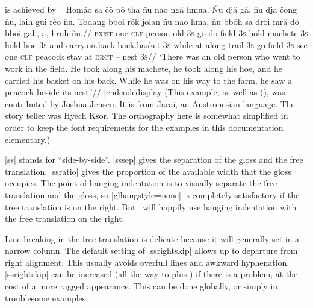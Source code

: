 \noindent is achieved by
\codedisplay~
\ex[glftpos=right,glhangstyle=none]
\let\\=\textsc
\begingl
\gla
Hom\^{a}o sa \v{c}\^{o} p\^{o} tha  \~{n}u nao ng\u{a} hmua. \~{N}u
dj\u{a} g\u{a}, \~{n}u dj\u{a} \v{c}\u{o}ng \~{n}u, laih gui r\^{e}o
\~{n}u. Todang bboi r\^{o}k jolan \~{n}u nao hma, \~{n}u bb\^{o}h sa
droi mr\u{a} d\u{o} bboi gah, a, hruh \~{n}u.//
\glb
\\{exist} one \\{clf} person old \\{3s} go do field \\{3s} hold
machete \\{3s} hold hoe \\{3s} and carry.on.back back.basket \\{3s}
while at along trail \\{3s} go field \\{3s} see one \\{clf} peacock
stay at \\{drct} -- nest \\{3s}//
\glft
`There was an old person who went to work in the field. He took
along his machete, he took along his hoe, and he carried his
basket on his back. While he was on his way to the farm, he saw a
peacock beside its nest.'//
\endgl
\xe
|endcodedisplay
(This example, as well as (), was contributed by
Joshua Jensen.  It is from Jarai, an Austronesian language.  The
story teller was Hyech Ksor.  The orthography here is somewhat
simplified in order to keep the font requirements for the
examples in this documentation elementary.)

|ss| stands for ``side-by-side''. |sssep| gives the separation of the
gloss and the free translation. |ssratio| gives the proportion of the
available width that the gloss occupies. The point of hanging
indentation is to visually separate the free translation and the
gloss, so |glhangstyle=none| is completely satisfactory if the
tree translation is on the right. But \ExPex\ will happily use
hanging indentation with the free translation on the right.

Line breaking in the free translation is delicate because it will
generally set in a narrow column. The default setting of |ssrightskip|
allows up to \textdim{2 em} departure from right alignment. This usually avoids
overfull lines and awkward hyphenation.  |ssrightskip| can be
increased (all the way to \textdim{0 pt} plus ) if there is a
problem, at the cost of a more ragged appearance.  This can be done
globally, or simply in troublesome examples.

